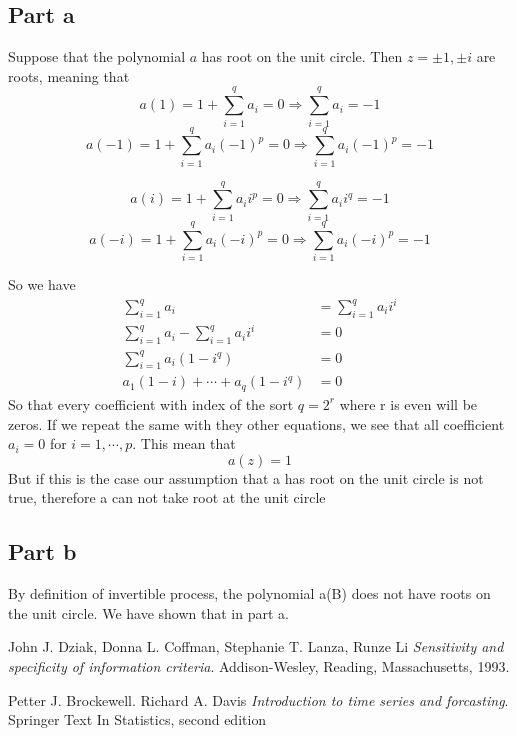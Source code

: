 \documentclass[11pt, oneside]{article}   	%
\begin{document}
\subsection{Part a}
Suppose that the polynomial $a$ has root on the unit circle. Then $z=\pm1, \pm i$ are roots, meaning that
\begin{equation}
a(1) = 1+ \sum_{i=1}^{q}a_{i} = 0\Rightarrow \sum_{i=1}^{q}a_{i} = -1
\end{equation}
\begin{equation}
a(-1) = 1+ \sum_{i=1}^{q}a_{i}(-1)^{p} = 0\Rightarrow \sum_{i=1}^{q}a_{i}(-1)^{p} = -1
\end{equation}

\begin{equation}
a(i) = 1+ \sum_{i=1}^{q}a_{i}i^{p} = 0\Rightarrow \sum_{i=1}^{q}a_{i}i^{q} = -1
\end{equation}
\begin{equation}
a(-i) = 1+ \sum_{i=1}^{q}a_{i}(-i)^{p} = 0\Rightarrow \sum_{i=1}^{q}a_{i}(-i)^{p} = -1
\end{equation}

So we have 
\begin{equation}
\begin{split}
\sum_{i=1}^{q}a_{i} &=  \sum_{i=1}^{q}a_{i}i^{i}\\
\sum_{i=1}^{q}a_{i}-\sum_{i=1}^{q}a_{i}i^{i}&=0\\
\sum_{i=1}^{q}a_{i}(1-i^{q})&=0\\
a_{1}(1-i) + \cdots+ a_{q}(1-i^{q})&=0
\end{split}
\end{equation}
So that every coefficient with index of the sort $q=2^{r}$ where r is even will be zeros. If we repeat the same with they other equations, we see that all coefficient $a_{i} =0$ for 
$i = 1, \cdots, p$. This mean that 
\begin{equation}
a(z) = 1
\end{equation}
But if this is the case our assumption that a has root on the unit circle is not true, therefore a can not take root at the unit circle

\subsection{Part b}
By definition of invertible process, the polynomial a(B) does not have roots on the unit circle. We have shown that in part a.









\begin{thebibliography}{9}
John J. Dziak, Donna L. Coffman, Stephanie T. Lanza, Runze Li
\textit{Sensitivity and specificity of information criteria}. 
Addison-Wesley, Reading, Massachusetts, 1993.
 
Petter J. Brockewell. Richard A. Davis 
\textit{Introduction to time series and forcasting}. 
Springer Text In Statistics, second edition
 \end{thebibliography}
\end{document}
